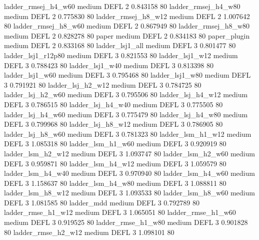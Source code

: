    ladder_rmsej_h4_w60     medium     DEFL                 2 0.843158 80
   ladder_rmsej_h4_w80     medium     DEFL                 2 0.775830 80
   ladder_rmsej_h8_w12     medium     DEFL                 2 1.007642 80
   ladder_rmsej_h8_w60     medium     DEFL                 2 0.867949 80
   ladder_rmsej_h8_w80     medium     DEFL                 2 0.828278 80
                 paper     medium     DEFL                 2 0.834183 80
          paper_plugin     medium     DEFL                 2 0.833168 80
       ladder_lsj1_all     medium     DEFL                 3 0.801477 80
    ladder_lsj1_r12p80     medium     DEFL                 3 0.821553 80
       ladder_lsj1_w12     medium     DEFL                 3 0.788423 80
       ladder_lsj1_w40     medium     DEFL                 3 0.813398 80
       ladder_lsj1_w60     medium     DEFL                 3 0.795468 80
       ladder_lsj1_w80     medium     DEFL                 3 0.791921 80
     ladder_lsj_h2_w12     medium     DEFL                 3 0.784725 80
     ladder_lsj_h2_w60     medium     DEFL                 3 0.795506 80
     ladder_lsj_h4_w12     medium     DEFL                 3 0.786515 80
     ladder_lsj_h4_w40     medium     DEFL                 3 0.775505 80
     ladder_lsj_h4_w60     medium     DEFL                 3 0.775479 80
     ladder_lsj_h4_w80     medium     DEFL                 3 0.799968 80
     ladder_lsj_h8_w12     medium     DEFL                 3 0.786905 80
     ladder_lsj_h8_w60     medium     DEFL                 3 0.781323 80
     ladder_lsm_h1_w12     medium     DEFL                 3 1.085318 80
     ladder_lsm_h1_w60     medium     DEFL                 3 0.920919 80
     ladder_lsm_h2_w12     medium     DEFL                 3 1.093747 80
     ladder_lsm_h2_w60     medium     DEFL                 3 0.959871 80
     ladder_lsm_h4_w12     medium     DEFL                 3 1.059579 80
     ladder_lsm_h4_w40     medium     DEFL                 3 0.970940 80
     ladder_lsm_h4_w60     medium     DEFL                 3 1.158637 80
     ladder_lsm_h4_w80     medium     DEFL                 3 1.088811 80
     ladder_lsm_h8_w12     medium     DEFL                 3 1.093533 80
     ladder_lsm_h8_w60     medium     DEFL                 3 1.081585 80
            ladder_mdd     medium     DEFL                 3 0.792789 80
    ladder_rmse_h1_w12     medium     DEFL                 3 1.065051 80
    ladder_rmse_h1_w60     medium     DEFL                 3 0.919525 80
    ladder_rmse_h1_w80     medium     DEFL                 3 0.901828 80
    ladder_rmse_h2_w12     medium     DEFL                 3 1.098101 80
